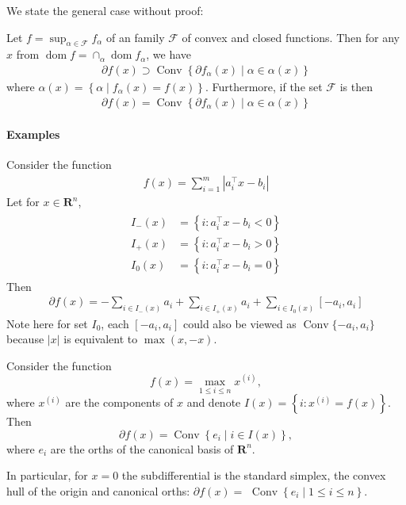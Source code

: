 \documentclass{article}
\newcommand{\Conv}{\operatorname{Conv}}
\newcommand{\dom}{\operatorname{dom}}
\begin{document}
We state the general case without proof:
\begin{lema}\label{lem:sup_convx_subg}
 Let $f=\sup _{\alpha \in \mathcal{F}} f_{\alpha}$ of an  family $\mathcal{F}$ of convex and closed functions. Then for any $x$ from $\dom  f=\cap_{\alpha} \dom f_{\alpha}$, we have
\begin{align*}
\partial f(x) \supset \operatorname{Conv}\left\{\partial f_{\alpha}(x) \mid \alpha \in \alpha(x)\right\}
\end{align*}
where $\alpha(x)=\left\{\alpha \mid f_{\alpha}(x)=f(x)\right\}$. Furthermore, if the set $\mathcal{F}$ is  then
\begin{align*}
\partial f(x)=\operatorname{Conv}\left\{\partial f_{\alpha}(x) \mid \alpha \in \alpha(x)\right\}
\end{align*}
\end{lema}
\paragraph{Examples}
\begin{exma}
Consider the function
\begin{align*}
f(x)=\sum_{i=1}^{m}\left|a_{i}^{\top}x-b_{i}\right|
\end{align*}
Let for $x \in \mathbf{R}^{n}$,
\begin{align*}
\begin{aligned}
I_{-}(x) &=\left\{i: a_{i}^{\top}x-b_{i}<0\right\} \\
I_{+}(x) &=\left\{i: a_{i}^{\top}x-b_{i}>0\right\} \\
I_{0}(x) &=\left\{i: a_{i}^{\top}x-b_{i}=0\right\}
\end{aligned}
\end{align*}
Then
\begin{align*}
\partial f(x)=-\sum_{i \in I_{-}(x)} a_{i}+\sum_{i \in I_{+}(x)} a_{i}+\sum_{i \in I_{0}(x)}\left[-a_{i}, a_{i}\right]
\end{align*}
Note here for set $I_{0}$, each $[-a_{i}, a_{i}]$ could also be viewed as $\Conv \{-a_{i}, a_{i}\}$ because $|x|$ is equivalent to $\max(x,-x)$.
\end{exma}
\begin{exma}
Consider the function $$f(x)=\max _{1 \leq i \leq n} x^{(i)},$$ where $x^{(i)}$ are the components of $x$ and denote $I(x)=\left\{i: x^{(i)}=f(x)\right\} .$ Then $$\partial f(x)=\operatorname{Conv}\left\{e_{i} \mid i \in I(x)\right\},$$ where $e_{i}$ are the orths of the canonical basis of $\mathbf{R}^{n}$. 

In particular, for $x=0$ the subdifferential is the standard simplex, the convex hull of the origin and canonical orths: $\partial f(x)=$ $\operatorname{Conv}\left\{e_{i} \mid 1 \leq i \leq n\right\}$.
\end{exma}
\end{document}
